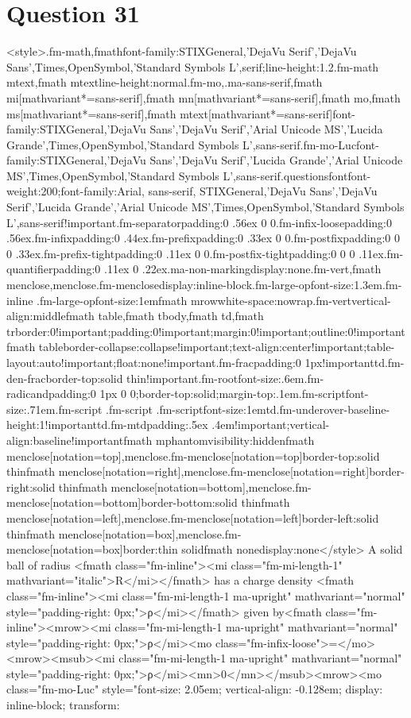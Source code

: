 \documentclass{article}
\begin{document}
\section*{Question 31}
<style>.fm-math,fmath{font-family:STIXGeneral,'DejaVu Serif','DejaVu Sans',Times,OpenSymbol,'Standard Symbols L',serif;line-height:1.2}.fm-math mtext,fmath mtext{line-height:normal}.fm-mo,.ma-sans-serif,fmath mi[mathvariant*=sans-serif],fmath mn[mathvariant*=sans-serif],fmath mo,fmath ms[mathvariant*=sans-serif],fmath mtext[mathvariant*=sans-serif]{font-family:STIXGeneral,'DejaVu Sans','DejaVu Serif','Arial Unicode MS','Lucida Grande',Times,OpenSymbol,'Standard Symbols L',sans-serif}.fm-mo-Luc{font-family:STIXGeneral,'DejaVu Sans','DejaVu Serif','Lucida Grande','Arial Unicode MS',Times,OpenSymbol,'Standard Symbols L',sans-serif}.questionsfont{font-weight:200;font-family:Arial, sans-serif, STIXGeneral,'DejaVu Sans','DejaVu Serif','Lucida Grande','Arial Unicode MS',Times,OpenSymbol,'Standard Symbols L',sans-serif!important}.fm-separator{padding:0 .56ex 0 0}.fm-infix-loose{padding:0 .56ex}.fm-infix{padding:0 .44ex}.fm-prefix{padding:0 .33ex 0 0}.fm-postfix{padding:0 0 0 .33ex}.fm-prefix-tight{padding:0 .11ex 0 0}.fm-postfix-tight{padding:0 0 0 .11ex}.fm-quantifier{padding:0 .11ex 0 .22ex}.ma-non-marking{display:none}.fm-vert,fmath menclose,menclose.fm-menclose{display:inline-block}.fm-large-op{font-size:1.3em}.fm-inline .fm-large-op{font-size:1em}fmath mrow{white-space:nowrap}.fm-vert{vertical-align:middle}fmath table,fmath tbody,fmath td,fmath tr{border:0!important;padding:0!important;margin:0!important;outline:0!important}fmath table{border-collapse:collapse!important;text-align:center!important;table-layout:auto!important;float:none!important}.fm-frac{padding:0 1px!important}td.fm-den-frac{border-top:solid thin!important}.fm-root{font-size:.6em}.fm-radicand{padding:0 1px 0 0;border-top:solid;margin-top:.1em}.fm-script{font-size:.71em}.fm-script .fm-script .fm-script{font-size:1em}td.fm-underover-base{line-height:1!important}td.fm-mtd{padding:.5ex .4em!important;vertical-align:baseline!important}fmath mphantom{visibility:hidden}fmath menclose[notation=top],menclose.fm-menclose[notation=top]{border-top:solid thin}fmath menclose[notation=right],menclose.fm-menclose[notation=right]{border-right:solid thin}fmath menclose[notation=bottom],menclose.fm-menclose[notation=bottom]{border-bottom:solid thin}fmath menclose[notation=left],menclose.fm-menclose[notation=left]{border-left:solid thin}fmath menclose[notation=box],menclose.fm-menclose[notation=box]{border:thin solid}fmath none{display:none}</style> A solid ball of radius <fmath class="fm-inline"><mi class="fm-mi-length-1" mathvariant="italic">R</mi></fmath> has a charge density <fmath class="fm-inline"><mi class="fm-mi-length-1 ma-upright" mathvariant="normal" style="padding-right: 0px;">ρ</mi></fmath> given by<fmath class="fm-inline"><mrow><mi class="fm-mi-length-1 ma-upright" mathvariant="normal" style="padding-right: 0px;">ρ</mi><mo class="fm-infix-loose">=</mo><mrow><msub><mi class="fm-mi-length-1 ma-upright" mathvariant="normal" style="padding-right: 0px;">ρ</mi><mn>0</mn></msub><mrow><mo class="fm-mo-Luc" style="font-size: 2.05em; vertical-align: -0.128em; display: inline-block; transform: 
\end{document}
